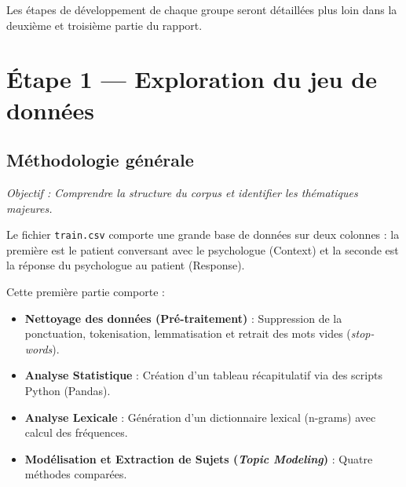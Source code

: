 \documentclass[12pt,a4paper]{report}
\begin{document}
\bigskip

\begin{note}
Les étapes de développement de chaque groupe seront détaillées plus loin dans la deuxième et troisième partie du rapport.
\end{note}

\pagebreak

\part{Étape 1 — Exploration du jeu de données}

\chapter{Méthodologie générale}

\textit{Objectif : Comprendre la structure du corpus et identifier les thématiques majeures.}

Le fichier \texttt{train.csv} comporte une grande base de données sur deux colonnes : la première est le patient conversant avec le psychologue (Context) et la seconde est la réponse du psychologue au patient (Response).

Cette première partie comporte :
\begin{itemize}
    \item \textbf{Nettoyage des données (Pré-traitement)} : Suppression de la ponctuation, tokenisation, lemmatisation et retrait des mots vides (\textit{stop-words}).
    \item \textbf{Analyse Statistique} : Création d'un tableau récapitulatif via des scripts Python (Pandas).
    \item \textbf{Analyse Lexicale} : Génération d'un dictionnaire lexical (n-grams) avec calcul des fréquences.
    \item \textbf{Modélisation et Extraction de Sujets (\textit{Topic Modeling})} : Quatre méthodes comparées.
\end{itemize}
\end{document}
